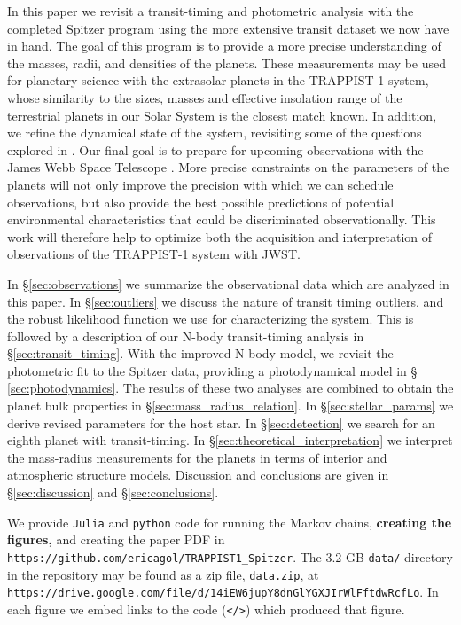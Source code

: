 \documentclass[twocolumn]{aastex63}
\begin{document}
In this paper we revisit a transit-timing and photometric analysis with the completed
Spitzer program using the more extensive transit dataset we now have in hand.  The goal of
this program is to provide a more precise understanding of the masses, radii, and
densities of the planets.  These measurements may be used for planetary science with the extrasolar planets in the TRAPPIST-1 system, whose similarity to the sizes, masses  and effective insolation range of the terrestrial planets in our Solar System is the closest match known.  In addition, we refine the dynamical
state of the system, revisiting some of the questions explored in \citet{Grimm2018}.
Our final goal is to prepare for upcoming observations with the James Webb Space
Telescope \citep[JWST][]{Gardner2006}.  More precise constraints on the parameters of the planets will not only improve the precision with which we can schedule observations, but also provide the best possible predictions of potential environmental characteristics that could be discriminated observationally.  This work will therefore help to optimize both the acquisition and interpretation of observations of the TRAPPIST-1 system with JWST.

In \S \ref{sec:observations} we summarize the observational data which are analyzed
in this paper.  In \S \ref{sec:outliers} we discuss the nature of transit
timing outliers, and the robust likelihood function we use for characterizing the
system.  This is followed by a description of our N-body transit-timing analysis
in \S \ref{sec:transit_timing}.  With the improved N-body model, we revisit the
photometric fit to the Spitzer data, providing a photodynamical model in \S
\ref{sec:photodynamics}.  The results of these two analyses are combined to
obtain the planet bulk properties in \S \ref{sec:mass_radius_relation}.  In \S \ref{sec:stellar_params} we derive revised parameters for the host star.  In \S \ref{sec:detection} we search for an eighth planet with transit-timing.  In \S \ref{sec:theoretical_interpretation} we interpret the mass-radius measurements for the planets in terms of interior and atmospheric structure models.  Discussion and conclusions
are given in \S \ref{sec:discussion} and \S \ref{sec:conclusions}.

We provide \texttt{Julia} and \texttt{python} code for running the Markov chains,
\textbf{creating the figures,}
and creating the paper PDF in
\texttt{https://github.com/ericagol/TRAPPIST1\_Spitzer}.  
The 3.2 GB \texttt{data/} directory in the repository may be found as a
zip file, \texttt{data.zip}, at 
\texttt{\scriptsize https://drive.google.com/file/d/14iEW6jupY8dnGlYGXJIrWlFftdwRcfLo}.
In each figure we embed links to the code (\texttt{</>}) which produced that figure.
\end{document}
